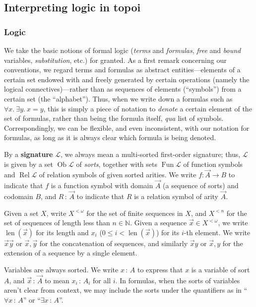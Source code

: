 \documentclass{amsart}
\newcommand\cL{\mathcal{L}}
\newcommand\defword[1]{{\boldmath \textbf{#1}}}
\newcommand\Fun{\operatorname{Fun}}
\newcommand\len{\operatorname{len}}
\newcommand\N{\mathbb{N}}
\newcommand\Ob{\operatorname{Ob}}
\newcommand\Rel{\operatorname{Rel}}
\newcommand\tolon{{\,:\,}}
\newcommand\vA{\vek{A}}
\newcommand\vek[1]{{\vec{#1}}}
\newcommand\vx{\vek{x}}
\newcommand\vy{\vek{y}}
\theoremstyle{definition}
\theoremstyle{remark}
\theoremstyle{plainwithref}
\begin{document}
\subsection{Interpreting logic in topoi} \label{subsec:logic-in-topoi}
\subsubsection{Logic}
We take the basic notions of formal logic (\emph{terms} and \emph{formulas}, \emph{free} and \emph{bound} variables, \emph{substitution}, etc.) for granted.
As a first remark concerning our conventions, we regard terms and formulas as abstract entities---elements of a certain set endowed with and freely generated by certain operations (namely the logical connectives)---rather than as sequences of elements (``symbols'') from a certain set (the ``alphabet'').
Thus, when we write down a formulas such as \( \forall x.\ \exists y.\ x = y \), this is simply a piece of notation to \emph{denote} a certain element of the set of formulas, rather than being the formula itself, \emph{qua} list of symbols.
Correspondingly, we can be flexible, and even inconsistent, with our notation for formulas, as long as it is always clear which formula is being denoted.

By a \defword{signature} \( \cL \), we always mean a multi-sorted first-order signature; thus, \( \cL \) is given by a set \( \Ob \cL \) of \emph{sorts}, together with sets \( \Fun \cL \) of function symbols and \( \Rel \cL \) of relation symbols of given sorted arities.
We write \( f \colon \vA \to B \) to indicate that \( f \) is a function symbol with domain \( \vA \) (a sequence of sorts) and codomain \( B \), and \( R \tolon \vA \) to indicate that \( R \) is a relation symbol of arity \( \vA \).

Given a set \( X \), write \( X^{< \omega} \) for the set of finite sequences in \( X \), and \( X^{< n} \) for the set of sequences of length less than \( n \in \N \).
Given a sequence \( \vx \in X^{<\omega} \), we write \( \len(\vx) \) for its length and \( x_i \) (\( 0 \le i < \len(\vx) \)) for its \( i \)-th element.
We write \( \vx \vy \) or \( \vx, \vy \) for the concatenation of sequences, and similarly \( \vx y \) or \( \vx, y \) for the extension of a sequence by a single element.

Variables are always sorted.
We write \( x \tolon A \) to express that \( x \) is a variable of sort \( A \), and \( \vx \tolon \vA \) to mean \( x_i \tolon A_i \) for all \( i \).
In formulas, when the sorts of variables aren't clear from context, we may include the sorts under the quantifiers as in ``\( \forall x \tolon A \)'' or ``\( \exists x \tolon A \)''.
\end{document}
